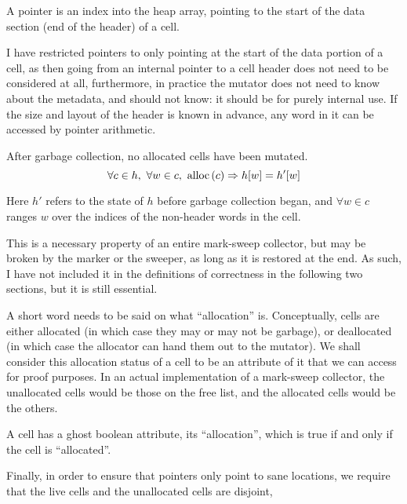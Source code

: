 \begin{definition}[Pointer]
  \label{def:ms-pointer}
  A pointer is an index into the heap array, pointing to the start of
  the data section (end of the header) of a cell.
\end{definition}

I have restricted \glspl{pointer} to only pointing at the start of the
data portion of a \gls{cell}, as then going from an internal
\gls{pointer} to a cell header does not need to be considered at all,
furthermore, in practice the \gls{mutator} does not need to know about
the metadata, and should not know: it should be for purely internal
use. If the size and layout of the header is known in advance, any
word in it can be accessed by \gls{pointer} arithmetic.

\begin{definition}
  \label{def:ms-word-preservation}
  After garbage collection, no allocated cells have been mutated.
   \[\forall c \in h,\ \forall w \in c,\ \mathrm{alloc}\left(c\right) \Rightarrow h[w] =
   h'[w]\]

   Here $h'$ refers to the state of $h$ before garbage collection
   began, and $\forall w \in c$ ranges $w$ over the indices of the
   non-header words in the cell.
\end{definition}

This is a necessary property of an entire mark-sweep collector, but
may be broken by the marker or the sweeper, as long as it is restored
at the end. As such, I have not included it in the definitions of
correctness in the following two sections, but it is still essential.

A short word needs to be said on what ``allocation'' is. Conceptually,
cells are either allocated (in which case they may or may not be
garbage), or deallocated (in which case the allocator can hand them
out to the mutator). We shall consider this allocation status of a
cell to be an attribute of it that we can access for proof
purposes. In an actual implementation of a mark-sweep collector, the
unallocated cells would be those on the free list, and the allocated
cells would be the others.

\begin{definition}[Allocation]
  \label{def:ms-allocation}
  A cell has a ghost boolean attribute, its ``allocation'', which is
  true if and only if the cell is ``allocated''.
\end{definition}

Finally, in order to ensure that pointers only point to sane
locations, we require that the live cells and the unallocated cells
are disjoint,

